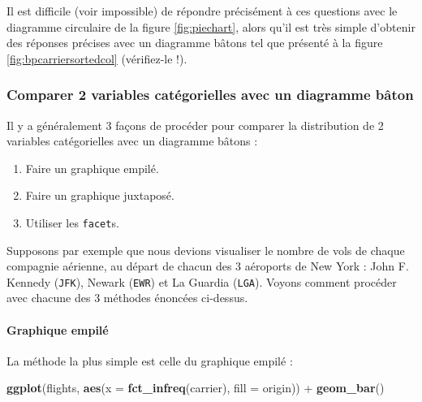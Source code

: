 \documentclass[
  a4paper,
]{article}
\newenvironment{Shaded}{\begin{snugshade}}{\end{snugshade}}
\newcommand{\DataTypeTok}[1]{\textcolor[rgb]{0.00,0.34,0.68}{#1}}
\newcommand{\KeywordTok}[1]{\textcolor[rgb]{0.12,0.11,0.11}{\textbf{#1}}}
\newcommand{\NormalTok}[1]{\textcolor[rgb]{0.12,0.11,0.11}{#1}}
\newcommand{\OperatorTok}[1]{\textcolor[rgb]{0.12,0.11,0.11}{#1}}
\newcommand{\StringTok}[1]{\textcolor[rgb]{0.75,0.01,0.01}{#1}}
\providecommand{\tightlist}{%
  \setlength{\itemsep}{0pt}\setlength{\parskip}{0pt}}
\begin{document}
Il est difficile (voir impossible) de répondre précisément à ces questions avec le diagramme circulaire de la figure \ref{fig:piechart}, alors qu'il est très simple d'obtenir des réponses précises avec un diagramme bâtons tel que présenté à la figure \ref{fig:bpcarriersortedcol} (vérifiez-le !).

\hypertarget{comparer-2-variables-catuxe9gorielles-avec-un-diagramme-buxe2ton}{%
\subsubsection{Comparer 2 variables catégorielles avec un diagramme bâton}\label{comparer-2-variables-catuxe9gorielles-avec-un-diagramme-buxe2ton}}

Il y a généralement 3 façons de procéder pour comparer la distribution de 2 variables catégorielles avec un diagramme bâtons :

\begin{enumerate}
\def\labelenumi{\arabic{enumi}.}
\tightlist
\item
  Faire un graphique empilé.
\item
  Faire un graphique juxtaposé.
\item
  Utiliser les \texttt{facet}s.
\end{enumerate}

Supposons par exemple que nous devions visualiser le nombre de vols de chaque compagnie aérienne, au départ de chacun des 3 aéroports de New York : John F. Kennedy (\texttt{JFK}), Newark (\texttt{EWR}) et La Guardia (\texttt{LGA}). Voyons comment procéder avec chacune des 3 méthodes énoncées ci-dessus.

\hypertarget{graphique-empiluxe9}{%
\paragraph{Graphique empilé}\label{graphique-empiluxe9}}

La méthode la plus simple est celle du graphique empilé :

\begin{Shaded}
\begin{Highlighting}[]
\KeywordTok{ggplot}\NormalTok{(flights, }\KeywordTok{aes}\NormalTok{(}\DataTypeTok{x =} \KeywordTok{fct_infreq}\NormalTok{(carrier), }\DataTypeTok{fill =}\NormalTok{ origin)) }\OperatorTok{+}
\StringTok{  }\KeywordTok{geom_bar}\NormalTok{()}
\end{Highlighting}
\end{Shaded}
\end{document}
